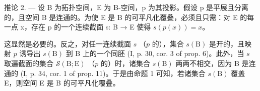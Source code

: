 推论 2. --- 设 B 为拓扑空间，E 为 B-空间，p 为其投影。假设 p 是平展且分离的，且空间 B 是连通的。为使 E 是 B 的可平凡化覆叠，必须且只需：对 E 的每一点 x，存在 p 的一个连续截面 s: B → E 使得 \(s(p(x)) = x\)。

这显然是必要的。反之，对任一连续截面 \(s\) （\(p\) 的），集合 \(s(\mathrm{B})\) 是开的，且映射 \(p\) 诱导出 \(s(\mathrm{B})\) 到 B 上的一个同胚 (I, p. 30, cor. 3 of prop. 6)。此外，当 \(s\) 取遍截面的集合 \(\mathcal{S}(\mathrm{B};\mathrm{E})\) （\(p\) 的）时，诸集合 \(s(\mathrm{B})\) 两两不相交，因为 B 是连通的 (I, p. 34, cor. 1 of prop. 11)。于是由命题 1 可知，若诸集合 \(s(\mathrm{B})\) 覆盖 E，则空间 E 是 B 的可平凡化覆叠。

